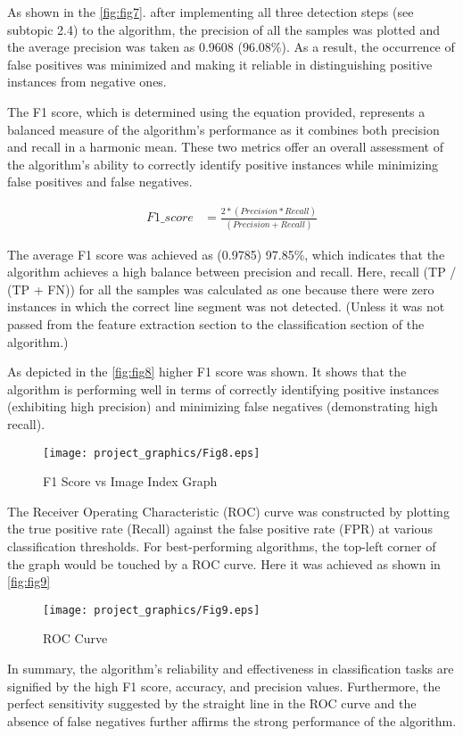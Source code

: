 \documentclass[]{iat}
\begin{document}
\par
As shown in the \autoref{fig:fig7}. after implementing all three detection steps (see subtopic 2.4) to the algorithm, the precision of all the samples was plotted and the average precision was taken as 0.9608 (96.08\%). As a result, the occurrence of false positives was minimized and making it reliable in distinguishing positive instances from negative ones.
\par
The F1 score, which is determined using the equation provided, represents a balanced measure of the algorithm's performance as it combines both precision and recall in a harmonic mean. These two metrics offer an overall assessment of the algorithm's ability to correctly identify positive instances while minimizing false positives and false negatives.
\par
\FloatBarrier
\begin{align}
F1\_score &=\frac{2*(Precision*Recall)}{(Precision+Recall)}
\end{align}

The average F1 score was achieved as (0.9785) 97.85\%, which indicates that the algorithm achieves a high balance between precision and recall. Here, recall (TP / (TP + FN)) for all the samples was calculated as one because there were zero instances in which the correct line segment was not detected. (Unless it was not passed from the feature extraction section to the classification section of the algorithm.)
\par
As depicted in the \autoref{fig:fig8} higher F1 score was shown. It shows that the algorithm is performing well in terms of correctly identifying positive instances (exhibiting high precision) and minimizing false negatives (demonstrating high recall). 
\par
\FloatBarrier
\begin{figure}[h]
    
	\texttt{[image: project\_graphics/Fig8.eps]}
	\caption{F1 Score vs Image Index Graph}
	\label{fig:fig8}
\end{figure}
The Receiver Operating Characteristic (ROC) curve was constructed by plotting the true positive rate (Recall) against the false positive rate (FPR) at various classification thresholds. For best-performing algorithms, the top-left corner of the graph would be touched by a ROC curve.
Here it was achieved as shown in \autoref{fig:fig9}
\par
\FloatBarrier
\begin{figure}[h]
	\texttt{[image: project\_graphics/Fig9.eps]}
	\caption{ROC Curve}
	\label{fig:fig9}
\end{figure}
\par
In summary, the algorithm's reliability and effectiveness in classification tasks are signified by the high F1 score, accuracy, and precision values. Furthermore, the perfect sensitivity suggested by the straight line in the ROC curve and the absence of false negatives further affirms the strong performance of the algorithm.
\par
\end{document}
